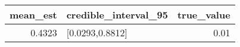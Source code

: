 \begin{longtable}{rlr}
\toprule
mean\_est & credible\_interval\_95 & true\_value \\ 
\midrule
0.4323 & [0.0293,0.8812] & 0.01 \\ 
\bottomrule
\end{longtable}

